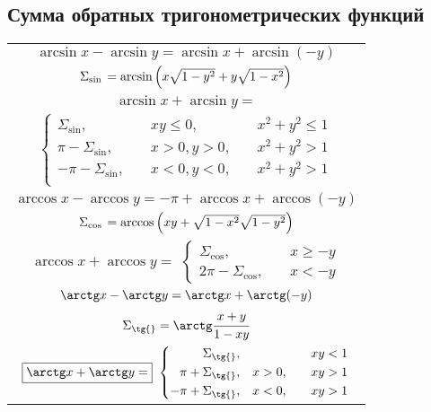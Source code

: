 \subsection{Сумма обратных тригонометрических функций}

{\renewcommand{\arraystretch}{1.5}
\begin{tabular}[t]{||c||}
	\hline
		$ \arcsin x - \arcsin y =  \arcsin x + \arcsin(-y) $ \\
		$ \Sigma_{\sin{}} = \arcsin\left(x\sqrt{\mathstrut 1-y^2}+y\sqrt{\mathstrut 1-x^2}\right) $ \\
	\hline
		$ \boxed{\arcsin x + \arcsin y =} $ \\
		$ \left\{ \begin{aligned}
			\Sigma_{\sin{}}, \quad & xy \leqslant 0,\quad & x^2 + y^2 \leqslant 1 \\
			\pi-\Sigma_{\sin{}}, \quad & x > 0, y > 0,\quad  & x^2 + y^2 > 1 \\
			-\pi-\Sigma_{\sin{}}, \quad & x < 0, y < 0,\quad & x^2 + y^2 > 1 \\
		\end{aligned} \right. $ \\
	\hline
	\hline
		$ \arccos x - \arccos y =  -\pi + \arccos x + \arccos(-y) $ \\
		$ \Sigma_{\cos{}} = \arccos\left(xy+\sqrt{\mathstrut 1-x^2}\sqrt{\mathstrut 1-y^2}\right) $ \\
	\hline
		$ \boxed{\arccos x + \arccos y =} $
		$ \left\{ \begin{aligned}
			\Sigma_{\cos{}}, \quad & x \geqslant -y \\
			2\pi-\Sigma_{\cos{}}, \quad & x < -y
		\end{aligned} \right. $ \\
	\hline
	\hline
		$ \arctg x - \arctg y =  \arctg x + \arctg(-y) $ \\
		$ \Sigma_{\tg{}} = \arctg\cfrac{x+y}{1-xy} $ \\
	\hline
		$ \boxed{\arctg x + \arctg y =} $
		$ \left\{ \begin{aligned}
			\Sigma_{\tg{}}, \quad & & xy < 1 \\
			\pi+\Sigma_{\tg{}}, \quad & x > 0, \quad & xy>1 \\
			-\pi+\Sigma_{\tg{}}, \quad & x < 0, \quad & xy>1 \\
		\end{aligned} \right. $ \\
	\hline
\end{tabular}}

